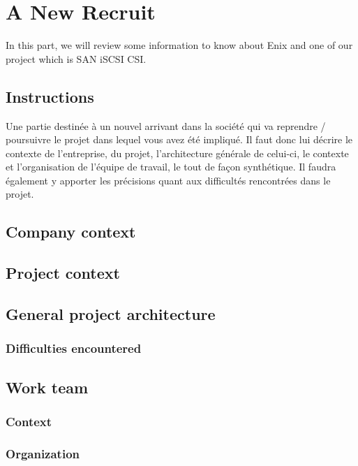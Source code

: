 \chapter{A New Recruit}

In this part, we will review some information to know about Enix and one of our project which is SAN iSCSI CSI.

\section{Instructions}
\color{red}
Une partie destinée à un nouvel arrivant dans la société qui va reprendre / poursuivre le projet dans lequel vous avez été impliqué. Il faut donc lui décrire le contexte de l’entreprise, du projet, l’architecture générale de celui-ci, le contexte et l’organisation de l’équipe de travail, le tout de façon synthétique. Il faudra également y apporter les précisions quant aux difficultés rencontrées dans le projet.
\color{black}

\clearpage

\section{Company context}

\section{Project context}

\section{General project architecture}
\subsection{Difficulties encountered}

\section{Work team}
\subsection{Context}
\subsection{Organization}

\clearpage
